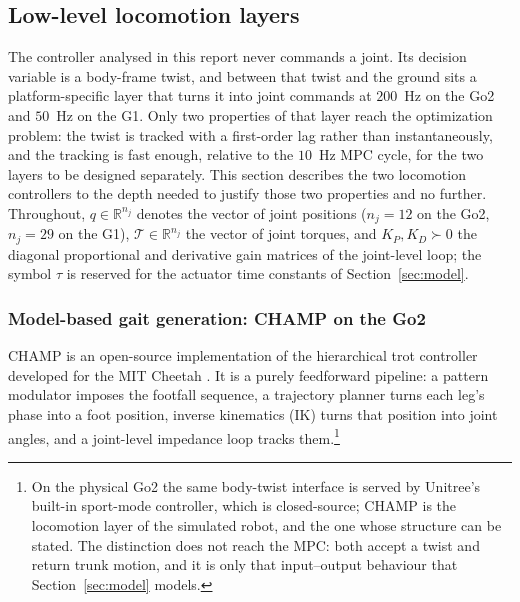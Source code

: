 \documentclass[11pt,a4paper]{article}
\newcommand{\R}{\mathbb{R}}
\begin{document}
\subsection{Low-level locomotion layers}
\label{sec:lowlevel}

The controller analysed in this report never commands a joint. Its decision variable is a body-frame twist,
and between that twist and the ground sits a platform-specific layer that turns it into joint commands at
$200$~Hz on the Go2 and $50$~Hz on the G1. Only two properties of that layer reach the optimization problem:
the twist is tracked with a first-order lag rather than instantaneously, and the tracking is fast enough,
relative to the $10$~Hz MPC cycle, for the two layers to be designed separately. This section describes the
two locomotion controllers to the depth needed to justify those two properties and no further. Throughout, $q\in\R^{n_j}$
denotes the vector of joint positions ($n_j=12$ on the Go2, $n_j=29$ on the G1), $\mathcal{T}\in\R^{n_j}$ the
vector of joint torques, and $K_P,K_D\succ0$ the diagonal proportional and derivative gain matrices of the
joint-level loop; the symbol $\tau$ is reserved for the actuator time constants of
Section~\ref{sec:model}.

\subsubsection{Model-based gait generation: CHAMP on the Go2}
\label{sec:champ}

CHAMP \cite{champ} is an open-source implementation of the hierarchical trot controller developed for the MIT
Cheetah \cite{lee2013hierarchical,hyun2014trot}. It is a purely feedforward pipeline: a pattern modulator
imposes the footfall sequence, a trajectory planner turns each leg's phase into a foot position, inverse
kinematics (IK) turns that position into joint angles, and a joint-level impedance loop tracks them.\footnote{On
the physical Go2 the same body-twist interface is served by Unitree's built-in sport-mode controller, which is
closed-source; CHAMP is the locomotion layer of the simulated robot, and the one whose structure can be
stated. The distinction does not reach the MPC: both accept a twist and return trunk motion, and it is only
that input--output behaviour that Section~\ref{sec:model} models.}
\end{document}
